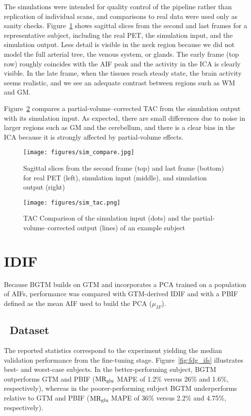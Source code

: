 The simulations were intended for quality control of the pipeline rather than replication of individual scans, and comparisons to real data were used only as sanity checks.
Figure~\ref{fig:sim_compare_imgs} shows sagittal slices from the second and last frames for a representative subject, including the real PET, the simulation input, and the simulation output.
Less detail is visible in the neck region because we did not model the full arterial tree, the venous system, or glands.
The early frame (top row) roughly coincides with the AIF peak and the activity in the ICA is clearly visible.
In the late frame, when the tissues reach steady state, the brain activity seems realistic, and we see an adequate contrast between regions such as WM and GM.

Figure~\ref{fig:sim_tac_compare} compares a partial-volume–corrected TAC from the simulation output with its simulation input.
As expected, there are small differences due to noise in larger regions such as GM and the cerebellum, and there is a clear bias in the ICA because it is strongly affected by partial-volume effects.

\begin{figure}[h]
	\centering
	\texttt{[image: figures/sim\_compare.jpg]}
	\caption{Sagittal slices from the second frame (top) and last frame (bottom) for real PET (left), simulation input (middle), and simulation output (right)}
	\label{fig:sim_compare_imgs}
\end{figure}

\begin{figure}[h]
	\centering
	\texttt{[image: figures/sim\_tac.png]}
	\caption{TAC Comparison of the simulation input (dots) and the partial-volume–corrected output (lines) of an example subject}
	\label{fig:sim_tac_compare}
\end{figure}

\section{IDIF}
Because BGTM builds on GTM and incorporates a PCA trained on a population of AIFs, performance was compared with GTM-derived IDIF and with a PBIF defined as the mean AIF used to build the PCA (\(\mu_{IF}\)).

\subsection{\fdg\ Dataset}
The reported statistics correspond to the experiment yielding the median validation performance from the fine-tuning stage.
Figure~\ref{fig:fdg_ifs} illustrates best- and worst-case subjects.
In the better-performing subject, BGTM outperforms GTM and PBIF (\(\text{MR}_{\text{glu}}\) MAPE of 1.2\% versus 26\% and 1.6\%, respectively), whereas in the poorer-performing subject BGTM underperforms relative to GTM and PBIF (\(\text{MR}_{\text{glu}}\) MAPE of 36\% versus 2.2\% and 4.75\%, respectively).

